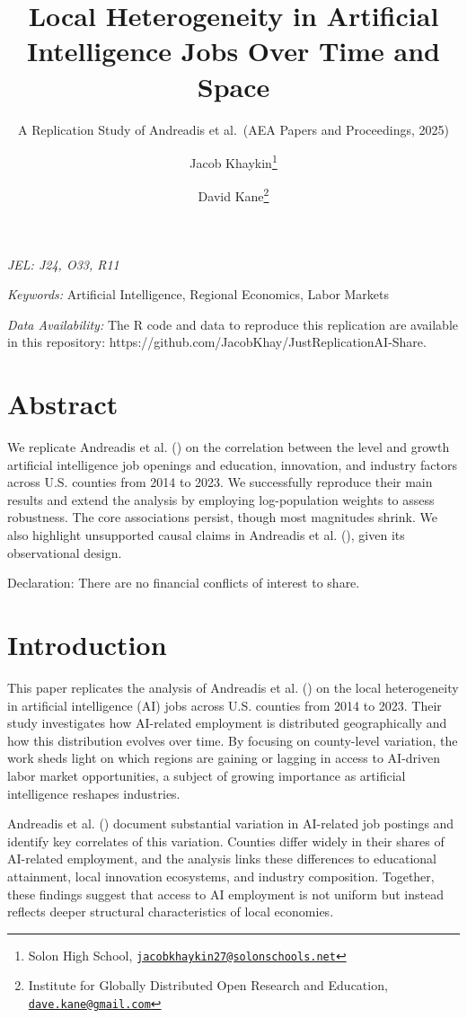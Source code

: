 \documentclass[
]{article}
\title{Local Heterogeneity in Artificial Intelligence Jobs Over Time and
Space}
\subtitle{A Replication Study of Andreadis et al.~(AEA Papers and
Proceedings, 2025)}
\author{Jacob Khaykin\footnote{Solon High School,
  \href{mailto:jacobkhaykin27@solonschools.net}{\nolinkurl{jacobkhaykin27@solonschools.net}}} \and David
Kane\footnote{Institute for Globally Distributed Open Research and
  Education,
  \href{mailto:dave.kane@gmail.com}{\nolinkurl{dave.kane@gmail.com}}}}
\date{}
\begin{document}
\maketitle


\emph{JEL: J24, O33, R11}

\emph{Keywords:} Artificial Intelligence, Regional Economics, Labor
Markets

\emph{Data Availability:} The R code and data to reproduce this
replication are available in this repository:
https://github.com/JacobKhay/JustReplicationAI-Share.

\section*{Abstract}\label{abstract}

We replicate Andreadis et al. () on
the correlation between the level and growth artificial intelligence job
openings and education, innovation, and industry factors across U.S.
counties from 2014 to 2023. We successfully reproduce their main results
and extend the analysis by employing log-population weights to assess
robustness. The core associations persist, though most magnitudes
shrink. We also highlight unsupported causal claims in Andreadis et al.
(), given its observational design.

Declaration: There are no financial conflicts of interest to share.

\newpage

\section{Introduction}\label{introduction}

This paper replicates the analysis of Andreadis et al.
() on the local heterogeneity in
artificial intelligence (AI) jobs across U.S. counties from 2014 to
2023. Their study investigates how AI-related employment is distributed
geographically and how this distribution evolves over time. By focusing
on county-level variation, the work sheds light on which regions are
gaining or lagging in access to AI-driven labor market opportunities, a
subject of growing importance as artificial intelligence reshapes
industries.

Andreadis et al. () document
substantial variation in AI-related job postings and identify key
correlates of this variation. Counties differ widely in their shares of
AI-related employment, and the analysis links these differences to
educational attainment, local innovation ecosystems, and industry
composition. Together, these findings suggest that access to AI
employment is not uniform but instead reflects deeper structural
characteristics of local economies.
\end{document}
